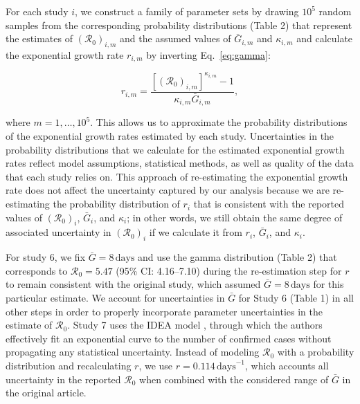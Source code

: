 \documentclass[12pt]{article}
\newcommand{\eref}[1]{Eq.~\ref{eq:#1}}
\newcommand{\Ro}{\ensuremath{{\mathcal R}_{0}}\xspace}
\providecommand{\DIFaddtex}[1]{{\protect\color{blue}\uwave{#1}}} %
\providecommand{\DIFaddbegin}{} %
\providecommand{\DIFaddend}{} %
\providecommand{\DIFadd}[1]{\texorpdfstring{\DIFaddtex{#1}}{#1}} %
\newcommand{\DIFaddincludegraphics}[2][]{{\color{blue}\fbox{\DIFOincludegraphics[#1]{#2}}}} %
\DeclareRobustCommand{\DIFaddbegin}{\DIFOaddbegin \let\includegraphics\DIFaddincludegraphics} %
\DeclareRobustCommand{\DIFaddend}{\DIFOaddend \let\includegraphics\DIFOincludegraphics} %
\begin{document}
For each study $i$, we construct a family of parameter sets by drawing $10^5$ random samples from the corresponding probability distributions (Table 2) that represent the estimates of $(\Ro)_{i,m}$ and the assumed values of $\bar G_{i,m}$ and $\kappa_{i,m}$ and calculate the exponential growth rate $r_{i,m}$ by inverting \eref{gamma}:
\begin{linenomath*}
\begin{equation}
r_{i,m} = \frac{\left[(\Ro)_{i,m}\right]^{\kappa_{i,m}} - 1}{\kappa_{i,m} \bar{G}_{i,m}},
\end{equation}
\end{linenomath*}
where $m=1,\dots,10^5$.
This allows us to approximate the probability distributions of the exponential growth rates estimated by each study.
Uncertainties in the probability distributions that we calculate for the estimated exponential growth rates reflect model assumptions, statistical methods, as well as \DIFaddbegin \DIFadd{the }\DIFaddend quality of the data that each study relies on.
This approach of re-estimating the exponential growth rate does not affect the uncertainty captured by our analysis because we are re-estimating the probability distribution of $r_i$ that is consistent with the reported values of $(\Ro)_i$, $\bar G_i$, and $\kappa_i$;
in other words, we still obtain the same degree of associated uncertainty in $(\Ro)_i$ if we calculate it from $r_i$, $\bar G_i$, and $\kappa_i$.

For study 6, we fix $\bar G=8\,\textrm{days}$ and use the gamma distribution (Table 2) that corresponds to $\mathcal R_0 = 5.47$ (95\% CI: 4.16--7.10) during the re-estimation step for $r$ to remain consistent with the original study, which assumed $\bar G=8\,\textrm{days}$ for this particular estimate.
We account for uncertainties in $\bar G$ for Study 6 (Table 1) in all other steps in order to properly incorporate parameter uncertainties in the estimate of \Ro.
Study 7 uses the IDEA model \citep{fisman2013idea}, through which the authors effectively fit an exponential curve to the number of confirmed cases without propagating any statistical uncertainty.
Instead of modeling \Ro with a probability distribution and recalculating $r$, we use $r=0.114\,\mathrm{days}^{-1}$, which accounts all uncertainty in the reported \Ro when combined with the considered range of $\bar G$ in the original article.
\end{document}
